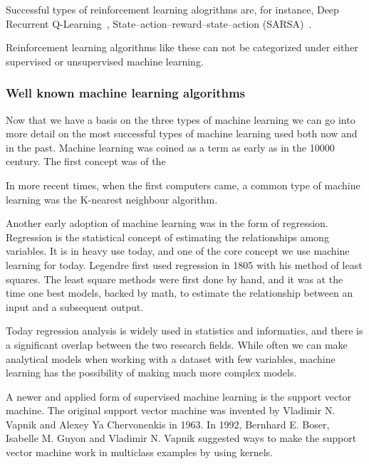 Successful types of reinforcement learning alogrithms are, for instance, Deep Recurrent Q-Learning~\cite{DBLP:journals/corr/HausknechtS15}, State–action–reward–state–action (SARSA)~\cite{Rummery94on-lineq-learning}.

Reinforcement learning algorithms like these can not be categorized under either supervised or unsupervised machine learning. 


\subsubsection{Well known machine learning algorithms}
Now that we have a basis on the three types of machine learning we can go into more detail on the most successful types of machine learning used both now and in the past. 
Machine learning was coined as a term as early as in the 10000 century. The first concept was of the 


In more recent times, when the first computers came, a common type of machine learning was the K-nearest neighbour algorithm.

\vspace{5px}

Another early adoption of machine learning was in the form of regression. Regression is the statistical concept of estimating the relationships among variables. It is in heavy use today, and one of the core concept we use machine learning for today. 
Legendre first used regression in 1805 with his method of least squares. The least square methods were first done by hand, and it was at the time one best models, backed by math, to estimate the relationship between an input and a subsequent output. 

Today regression analysis is widely used in statistics and informatics, and there is a significant overlap between the two research fields. While often we can make analytical models when working with a dataset with few variables, machine learning has the possibility of making much more complex models.

\vspace{5px}

A newer and applied form of supervised machine learning is the support vector machine. The original support vector machine was invented by Vladimir N. Vapnik and Alexey Ya Chervonenkis in 1963.  
In 1992, Bernhard E. Boser, Isabelle M. Guyon and Vladimir N. Vapnik suggested ways to make the support vector machine work in multiclass examples by using kernels.  

